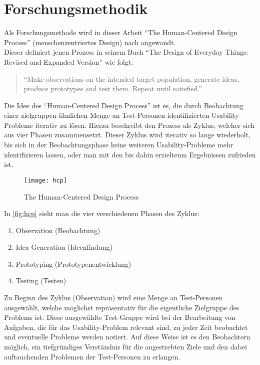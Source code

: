 \chapter{Forschungsmethodik}
Als Forschungsmethode wird in dieser Arbeit ``The Human-Centered Design Process'' (menschenzentriertes Design) nach \citeauthor{Norman13} angewandt. \\
Dieser definiert jenen Prozess in seinem Buch ``The Design of Everyday Things: Revised and Expanded Version'' wie folgt: \citep[Abbildung 6.2]{Norman13}

\begin{quote}
``Make observations on the intended target population, generate ideas, produce prototypes and test them.
Repeat until satisfied.''
\end{quote}

\noindent
Die Idee des ``Human-Centered Design Process'' ist es, die durch Beobachtung einer zielgruppen-ähnlichen Menge an Test-Personen identifizierten Usability-Probleme iterativ zu lösen.
Hierzu beschreibt \citeauthor{Norman13} den Prozess als Zyklus, welcher sich aus vier Phasen zusammensetzt.
Dieser Zyklus wird iterativ so lange wiederholt, bis sich in der Beobachtungsphase keine weiteren Usability-Probleme mehr identifizieren lassen, oder man mit den bis dahin erzieltenm Ergebnissen zufrieden ist. \\

\begin{figure}[h]
	\centering
	\texttt{[image: hcp]}
	\caption{The Human-Centered Design Process}
	\label{fig:hcp}
\end{figure}

\noindent
In \autoref{fig:hcp} sieht man die vier verschiedenen Phasen des Zyklus:
\begin{enumerate}
	\item Observation (Beobachtung) \label{itm:observation}
  \item Idea Generation (Ideenfindung) \label{itm:idea}
  \item Prototyping (Prototypenentwicklung) \label{itm:prototyping}
	\item Testing (Testen) \label{itm:testing}
\end{enumerate}

\noindent
Zu Beginn des Zyklus (Observation) wird eine Menge an Test-Personen ausgewählt, welche möglichst repräsentativ für die eigentliche Zielgruppe des Problems ist. 
Diese ausgewählte Test-Gruppe wird bei der Bearbeitung von Aufgaben, die für das Usability-Problem relevant sind, zu jeder Zeit beobachtet und eventuelle Probleme werden notiert. 
Auf diese Weise ist es den Beobachtern möglich, ein tiefgründiges Verständnis für die angestrebten Ziele und den dabei auftauchenden Problemen der Test-Personen zu erlangen. \\

